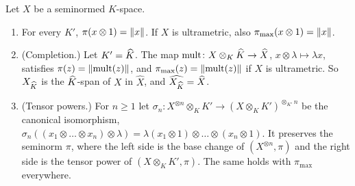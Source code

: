 \begin{theorem}[$X\to X_{K'}$ is isometric]\label{dp:thm:base-change-isometric}
Let $X$ be a seminormed $K$-space.
\begin{enumerate}
\item For every $K'$, $\pi(x\otimes1)=\lVert x\rVert$. If $X$ is ultrametric, also $\pi_{\max}(x\otimes1)=\lVert x\rVert$.
\item \textup{(Completion.)} Let $K'=\widehat K$. The map $\mathrm{mult}\colon X\otimes_K\widehat K\to\widehat X$, $x\otimes\lambda\mapsto\lambda x$, satisfies $\pi(z)=\lVert \mathrm{mult}(z)\rVert$, and $\pi_{\max}(z)=\lVert \mathrm{mult}(z)\rVert$ if $X$ is ultrametric. So $X_{\widehat K}$ is the $\widehat K$-span of $X$ in $\widehat X$, and $\widehat{X_{\widehat K}}=\widehat X$.
\item \textup{(Tensor powers.)} For $n\ge1$ let $\sigma_n\colon X^{\otimes n}\otimes_KK'\to(X\otimes_KK')^{\otimes_{K'}n}$ be the canonical isomorphism, $\sigma_n((x_1\otimes\dots\otimes x_n)\otimes\lambda)=\lambda(x_1\otimes1)\otimes\dots\otimes(x_n\otimes1)$. It preserves the seminorm $\pi$, where the left side is the base change of $(X^{\otimes n},\pi)$ and the right side is the tensor power of $(X\otimes_KK',\pi)$. The same holds with $\pi_{\max}$ everywhere.
\end{enumerate}
\end{theorem}

